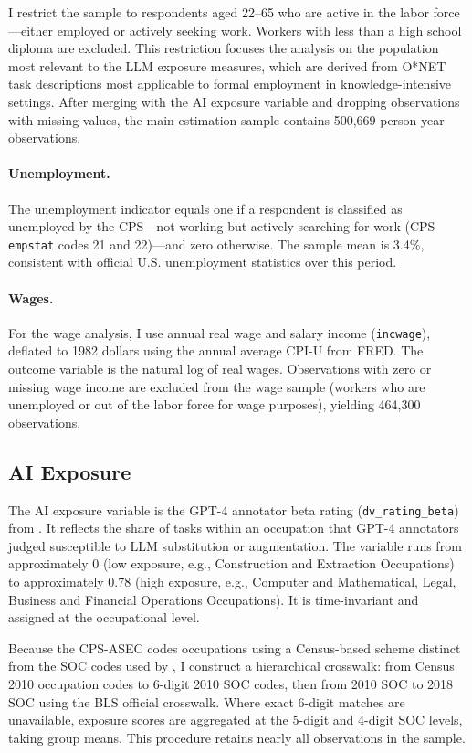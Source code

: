 \documentclass[11pt]{article}
\begin{document}
I restrict the sample to respondents aged 22--65 who are active in the labor force---either employed or actively seeking work. Workers with less than a high school diploma are excluded. This restriction focuses the analysis on the population most relevant to the LLM exposure measures, which are derived from O*NET task descriptions most applicable to formal employment in knowledge-intensive settings. After merging with the AI exposure variable and dropping observations with missing values, the main estimation sample contains 500,669 person-year observations.

\paragraph{Unemployment.} The unemployment indicator equals one if a respondent is classified as unemployed by the CPS---not working but actively searching for work (CPS \texttt{empstat} codes 21 and 22)---and zero otherwise. The sample mean is 3.4\%, consistent with official U.S. unemployment statistics over this period.

\paragraph{Wages.} For the wage analysis, I use annual real wage and salary income (\texttt{incwage}), deflated to 1982 dollars using the annual average CPI-U from FRED. The outcome variable is the natural log of real wages. Observations with zero or missing wage income are excluded from the wage sample (workers who are unemployed or out of the labor force for wage purposes), yielding 464,300 observations.

\subsection{AI Exposure}

The AI exposure variable is the GPT-4 annotator beta rating (\texttt{dv\_rating\_beta}) from \textcite{eloundou2024gpts}. It reflects the share of tasks within an occupation that GPT-4 annotators judged susceptible to LLM substitution or augmentation. The variable runs from approximately 0 (low exposure, e.g., Construction and Extraction Occupations) to approximately 0.78 (high exposure, e.g., Computer and Mathematical, Legal, Business and Financial Operations Occupations). It is time-invariant and assigned at the occupational level.

Because the CPS-ASEC codes occupations using a Census-based scheme distinct from the SOC codes used by \textcite{eloundou2024gpts}, I construct a hierarchical crosswalk: from Census 2010 occupation codes to 6-digit 2010 SOC codes, then from 2010 SOC to 2018 SOC using the BLS official crosswalk. Where exact 6-digit matches are unavailable, exposure scores are aggregated at the 5-digit and 4-digit SOC levels, taking group means. This procedure retains nearly all observations in the sample.
\end{document}
